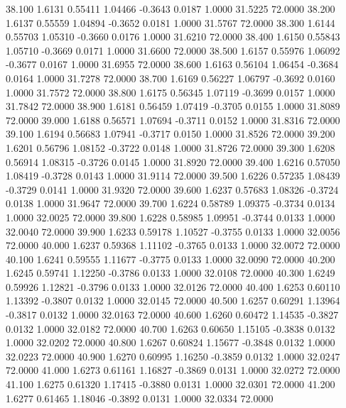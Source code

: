   38.100   1.6131   0.55411   1.04466  -0.3643   0.0187   1.0000  31.5225  72.0000
  38.200   1.6137   0.55559   1.04894  -0.3652   0.0181   1.0000  31.5767  72.0000
  38.300   1.6144   0.55703   1.05310  -0.3660   0.0176   1.0000  31.6210  72.0000
  38.400   1.6150   0.55843   1.05710  -0.3669   0.0171   1.0000  31.6600  72.0000
  38.500   1.6157   0.55976   1.06092  -0.3677   0.0167   1.0000  31.6955  72.0000
  38.600   1.6163   0.56104   1.06454  -0.3684   0.0164   1.0000  31.7278  72.0000
  38.700   1.6169   0.56227   1.06797  -0.3692   0.0160   1.0000  31.7572  72.0000
  38.800   1.6175   0.56345   1.07119  -0.3699   0.0157   1.0000  31.7842  72.0000
  38.900   1.6181   0.56459   1.07419  -0.3705   0.0155   1.0000  31.8089  72.0000
  39.000   1.6188   0.56571   1.07694  -0.3711   0.0152   1.0000  31.8316  72.0000
  39.100   1.6194   0.56683   1.07941  -0.3717   0.0150   1.0000  31.8526  72.0000
  39.200   1.6201   0.56796   1.08152  -0.3722   0.0148   1.0000  31.8726  72.0000
  39.300   1.6208   0.56914   1.08315  -0.3726   0.0145   1.0000  31.8920  72.0000
  39.400   1.6216   0.57050   1.08419  -0.3728   0.0143   1.0000  31.9114  72.0000
  39.500   1.6226   0.57235   1.08439  -0.3729   0.0141   1.0000  31.9320  72.0000
  39.600   1.6237   0.57683   1.08326  -0.3724   0.0138   1.0000  31.9647  72.0000
  39.700   1.6224   0.58789   1.09375  -0.3734   0.0134   1.0000  32.0025  72.0000
  39.800   1.6228   0.58985   1.09951  -0.3744   0.0133   1.0000  32.0040  72.0000
  39.900   1.6233   0.59178   1.10527  -0.3755   0.0133   1.0000  32.0056  72.0000
  40.000   1.6237   0.59368   1.11102  -0.3765   0.0133   1.0000  32.0072  72.0000
  40.100   1.6241   0.59555   1.11677  -0.3775   0.0133   1.0000  32.0090  72.0000
  40.200   1.6245   0.59741   1.12250  -0.3786   0.0133   1.0000  32.0108  72.0000
  40.300   1.6249   0.59926   1.12821  -0.3796   0.0133   1.0000  32.0126  72.0000
  40.400   1.6253   0.60110   1.13392  -0.3807   0.0132   1.0000  32.0145  72.0000
  40.500   1.6257   0.60291   1.13964  -0.3817   0.0132   1.0000  32.0163  72.0000
  40.600   1.6260   0.60472   1.14535  -0.3827   0.0132   1.0000  32.0182  72.0000
  40.700   1.6263   0.60650   1.15105  -0.3838   0.0132   1.0000  32.0202  72.0000
  40.800   1.6267   0.60824   1.15677  -0.3848   0.0132   1.0000  32.0223  72.0000
  40.900   1.6270   0.60995   1.16250  -0.3859   0.0132   1.0000  32.0247  72.0000
  41.000   1.6273   0.61161   1.16827  -0.3869   0.0131   1.0000  32.0272  72.0000
  41.100   1.6275   0.61320   1.17415  -0.3880   0.0131   1.0000  32.0301  72.0000
  41.200   1.6277   0.61465   1.18046  -0.3892   0.0131   1.0000  32.0334  72.0000
